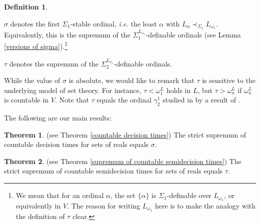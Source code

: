 \documentclass[a4paper,11pt]{amsart}
\theoremstyle{definition}
\newtheorem*{theorem*}{Theorem}
\newtheorem{definition}[fact]{Definition}
\newtheorem*{problem A}{Problem 1}
\newtheorem*{problem B}{Problem 2}
\theoremstyle{remark}
\newenvironment{enumerate-(a)}{\begin{enumerate}[label={\upshape (\alph*)}, leftmargin=2pc]}{\end{enumerate}}
\begin{document}
\begin{definition} \ 
\begin{enumerate-(a)} 
\item 
$\sigma$ denotes the first $\Sigma_1$-stable ordinal, {\em i.e.} the least $\alpha$ with $L_\alpha\prec_{\Sigma_1}L_{\omega_1}$.
Equivalently, this is the supremum of the $\Sigma_1^{L_{\omega_{1}}}$-definable ordinals (see Lemma \ref{versions of sigma}).\footnote{We mean that for an ordinal $\alpha$, the set $\{\alpha\}$ is $\Sigma_1$-definable over $L_{\omega_1}$, or equivalently in $V$. The reason for writing $L_{\omega_1}$ here is to make the analogy with the definition of $\tau$ clear. } 
\item 
$\tau$ denotes the supremum of the $\Sigma_{2}^{L_{\omega_{1}}}$-definable ordinals. 
\end{enumerate-(a)} 
\end{definition} 

While the value of $\sigma$ is absolute, we would like to remark that $\tau$ is sensitive to the underlying model of set theory. 
For instance, $\tau<\omega_1^L$ holds in $L$, but $\tau>\omega_n^L$ if $\omega_n^L$ is countable in $V$. 
Note that $\tau$ equals the ordinal $\gamma^1_2$ studied in \cite{MR1011178} by a result of \cite{countableranks}. 

The following are our main results: 

\begin{theorem*} (see Theorem \ref{countable decision times}) 
The strict supremum of countable decision times for sets of reals equals $\sigma$. 
\end{theorem*} 



\begin{theorem*} (see Theorem \ref{supremum of countable semidecision times}) 
The strict supremum of countable semidecision times for sets of reals equals $\tau$.  
\end{theorem*} 

\end{document}
